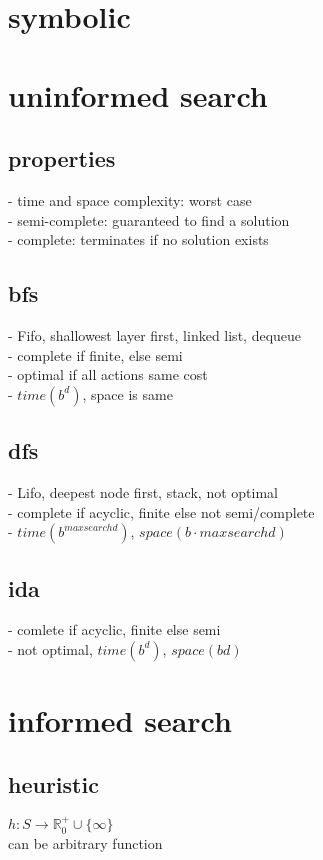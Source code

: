 \section{symbolic}
\section*{uninformed search}
\subsection*{properties}
- time and space complexity: worst case \\
 - semi-complete: guaranteed to find a solution \\
 - complete: terminates if no solution exists 
 
\subsection*{bfs}
- Fifo, shallowest layer first, linked list, dequeue\\
- complete if finite, else semi\\
- optimal if all actions same cost \\
- $time(b^d)$, space is same

\subsection*{dfs}
- Lifo, deepest node first, stack, not optimal\\
- complete if acyclic, finite else not semi/complete\\
- $time(b^{maxsearchd})$, $space(b \cdot maxsearchd)$

\subsection*{ida}
- comlete if acyclic, finite else semi \\
- not optimal, $time(b^d)$, $space(bd)$

\section*{informed search}
\subsection*{heuristic}
$h: S \rightarrow \mathbb{R}_0^{+} \cup \{\infty\}$ \\
can be arbitrary function

